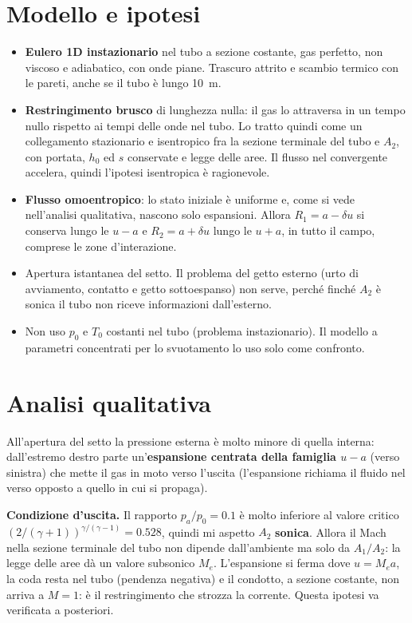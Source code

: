 \documentclass[11pt,a4paper]{article}
\newcommand{\uma}{u-a}
\newcommand{\upa}{u+a}
\begin{document}
\section{Modello e ipotesi}
\begin{itemize}
\item \textbf{Eulero 1D instazionario} nel tubo a sezione costante, gas perfetto, non viscoso e adiabatico, con
  onde piane. Trascuro attrito e scambio termico con le pareti, anche se il tubo è lungo \SI{10}{m}.
\item \textbf{Restringimento brusco} di lunghezza nulla: il gas lo attraversa in un tempo nullo rispetto ai tempi
  delle onde nel tubo. Lo tratto quindi come un collegamento stazionario e isentropico fra la sezione terminale del
  tubo e $A_2$, con portata, $h_0$ ed $s$ conservate e legge delle aree. Il flusso nel convergente accelera, quindi
  l'ipotesi isentropica è ragionevole.
\item \textbf{Flusso omoentropico}: lo stato iniziale è uniforme e, come si vede nell'analisi qualitativa, nascono
  solo espansioni. Allora $R_1=a-\delta u$ si conserva lungo le $\uma$ e $R_2=a+\delta u$ lungo le $\upa$, in tutto
  il campo, comprese le zone d'interazione.
\item Apertura istantanea del setto. Il problema del getto esterno (urto di avviamento, contatto e getto
  sottoespanso) non serve, perché finché $A_2$ è sonica il tubo non riceve informazioni dall'esterno.
\item Non uso $p_0$ e $T_0$ costanti nel tubo (problema instazionario). Il modello a parametri concentrati per lo
  svuotamento lo uso solo come confronto.
\end{itemize}

\section{Analisi qualitativa}
All'apertura del setto la pressione esterna è molto minore di quella interna: dall'estremo destro parte
un'\textbf{espansione centrata della famiglia $\uma$} (verso sinistra) che mette il gas in moto verso
l'uscita (l'espansione richiama il fluido nel verso opposto a quello in cui si propaga).

\textbf{Condizione d'uscita.} Il rapporto $p_a/p_0=\num{0.1}$ è molto inferiore al valore critico
$(2/(\gamma+1))^{\gamma/(\gamma-1)}=\num{0.528}$, quindi mi aspetto $A_2$ \textbf{sonica}. Allora il Mach nella
sezione terminale del tubo non dipende dall'ambiente ma solo da $A_1/A_2$: la legge delle aree dà un valore
subsonico $M_e$. L'espansione si ferma dove $u=M_ea$, la coda resta nel tubo (pendenza negativa) e il
condotto, a sezione costante, non arriva a $M=1$: è il restringimento che strozza la corrente. Questa ipotesi va
verificata a posteriori.
\end{document}
